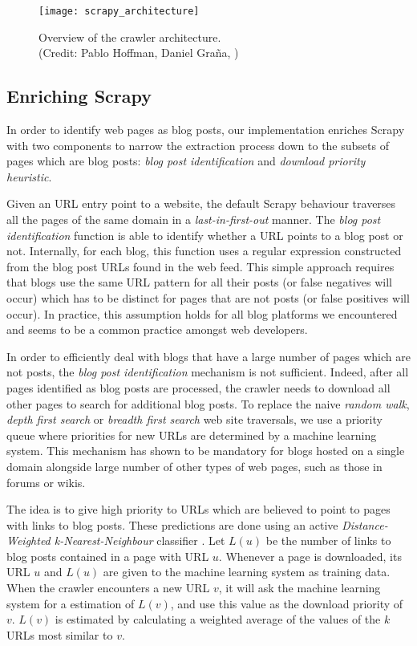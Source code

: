 \begin{figure}
  \capstart
  \centering
  \texttt{[image: scrapy\_architecture]}
  \caption{Overview of the crawler architecture.\\(Credit: Pablo Hoffman, Daniel Graña, \cite{scrapy2014})}
  \label{architecture}
\end{figure}


\subsection{Enriching Scrapy}\label{enrichingscrapy}

In order to identify web pages as blog posts, our implementation enriches Scrapy with two components to narrow the extraction process down to the subsets of pages which are blog posts: \emph{blog post identification} and \emph{download priority heuristic}.

Given an URL entry point to a website, the default Scrapy behaviour traverses all the pages of the same domain in a \emph{last-in-first-out} manner. The \emph{blog post identification} function is able to identify whether a URL points to a blog post or not. Internally, for each blog, this function uses a regular expression constructed from the blog post URLs found in the web feed. This simple approach requires that blogs use the same URL pattern for all their posts (or false negatives will occur) which has to be distinct for pages that are not posts (or false positives will occur). In practice, this assumption holds for all blog platforms we encountered and seems to be a common practice amongst web developers.

In order to efficiently deal with blogs that have a large number of pages which are not posts, the \emph{blog post identification} mechanism is not sufficient. Indeed, after all pages identified as blog posts are processed, the crawler needs to download all other pages to search for additional blog posts. To replace the naive \emph{random walk}, \emph{depth first search} or \emph{breadth first search} web site traversals, we use a priority queue where priorities for new URLs are determined by a machine learning system. This mechanism has shown to be mandatory for blogs hosted on a single domain alongside large number of other types of web pages, such as those in forums or wikis.

The idea is to give high priority to URLs which are believed to point to pages with links to blog posts. These predictions are done using an active \emph{Distance-Weighted k-Nearest-Neighbour} classifier \cite{dudani1976}. Let $L(u)$ be the number of links to blog posts contained in a page with URL $u$. Whenever a page is downloaded, its URL $u$ and $L(u)$ are given to the machine learning system as training data. When the crawler encounters a new URL $v$, it will ask the machine learning system for a estimation of $L(v)$, and use this value as the download priority of $v$. $L(v)$ is estimated by calculating a weighted average of the values of the $k$ URLs most similar to $v$.



